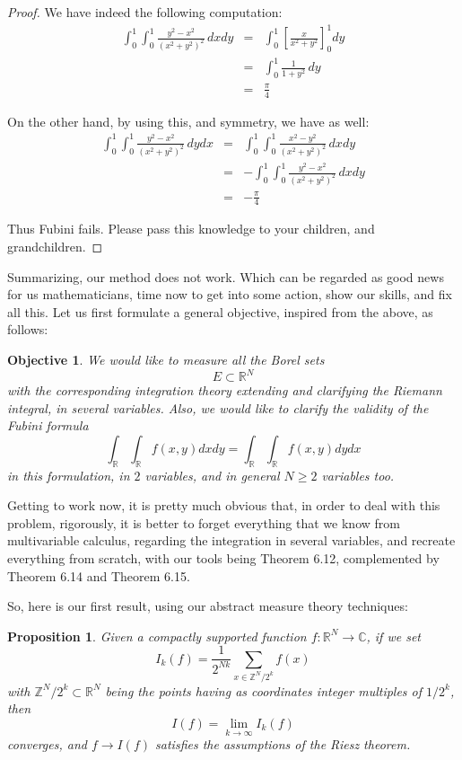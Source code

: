 \documentclass[12pt]{amsbook}
\newtheorem{objective}[theorem]{Objective}
\newtheorem{proposition}[theorem]{Proposition}
\begin{document}
\begin{proof}
We have indeed the following computation:
\begin{eqnarray*}
\int_0^1\int_0^1\frac{y^2-x^2}{(x^2+y^2)^2}\,dxdy
&=&\int_0^1\left[\frac{x}{x^2+y^2}\right]_0^1dy\\
&=&\int_0^1\frac{1}{1+y^2}\,dy\\
&=&\frac{\pi}{4}
\end{eqnarray*}

On the other hand, by using this, and symmetry, we have as well:
\begin{eqnarray*}
\int_0^1\int_0^1\frac{y^2-x^2}{(x^2+y^2)^2}\,dydx
&=&\int_0^1\int_0^1\frac{x^2-y^2}{(x^2+y^2)^2}\,dxdy\\
&=&-\int_0^1\int_0^1\frac{y^2-x^2}{(x^2+y^2)^2}\,dxdy\\
&=&-\frac{\pi}{4}
\end{eqnarray*}

Thus Fubini fails. Please pass this knowledge to your children, and grandchildren.
\end{proof}

Summarizing, our method does not work. Which can be regarded as good news for us mathematicians, time now to get into some action, show our skills, and fix all this. Let us first formulate a general objective, inspired from the above, as follows:

\begin{objective}
We would like to measure all the Borel sets 
$$E\subset\mathbb R^N$$
with the corresponding integration theory extending and clarifying the Riemann integral, in several variables. Also, we would like to clarify the validity of the Fubini formula
$$\int_\mathbb R\int_\mathbb Rf(x,y)dxdy=\int_\mathbb R\int_\mathbb Rf(x,y)dydx$$
in this formulation, in $2$ variables, and in general $N\geq2$ variables too.
\end{objective}

Getting to work now, it is pretty much obvious that, in order to deal with this problem, rigorously, it is better to forget everything that we know from multivariable calculus, regarding the integration in several variables, and recreate everything from scratch, with our tools being Theorem 6.12, complemented by Theorem 6.14 and Theorem 6.15.

\bigskip

So, here is our first result, using our abstract measure theory techniques:

\begin{proposition}
Given a compactly supported function $f:\mathbb R^N\to\mathbb C$, if we set
$$I_k(f)=\frac{1}{2^{Nk}}\sum_{x\in\mathbb Z^N/2^k}f(x)$$
with $\mathbb Z^N/2^k\subset\mathbb R^N$ being the points having as coordinates integer multiples of $1/2^k$, then
$$I(f)=\lim_{k\to\infty}I_k(f)$$
converges, and $f\to I(f)$ satisfies the assumptions of the Riesz theorem.
\end{proposition}
\end{document}
